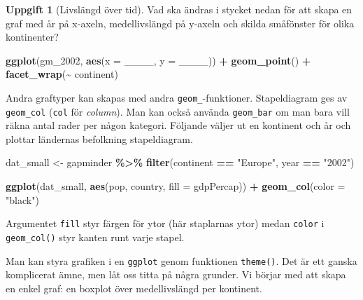 \documentclass[
]{book}
\newenvironment{Shaded}{\begin{snugshade}}{\end{snugshade}}
\newcommand{\AttributeTok}[1]{\textcolor[rgb]{0.13,0.29,0.53}{#1}}
\newcommand{\FunctionTok}[1]{\textcolor[rgb]{0.13,0.29,0.53}{\textbf{#1}}}
\newcommand{\NormalTok}[1]{#1}
\newcommand{\OtherTok}[1]{\textcolor[rgb]{0.56,0.35,0.01}{#1}}
\newcommand{\SpecialCharTok}[1]{\textcolor[rgb]{0.81,0.36,0.00}{\textbf{#1}}}
\newcommand{\StringTok}[1]{\textcolor[rgb]{0.31,0.60,0.02}{#1}}
\theoremstyle{definition}
\theoremstyle{definition}
\theoremstyle{definition}
\newtheorem{exercise}{Uppgift}[chapter]
\theoremstyle{definition}
\theoremstyle{remark}
\begin{document}
\begin{exercise}[Livslängd över tid]

Vad ska ändras i stycket nedan för att skapa en graf med år på x-axeln, medellivslängd på y-axeln och skilda småfönster för olika kontinenter?

\begin{Shaded}
\begin{Highlighting}[]
\FunctionTok{ggplot}\NormalTok{(gm\_2002, }\FunctionTok{aes}\NormalTok{(}\AttributeTok{x =}\NormalTok{ \_\_\_\_, }\AttributeTok{y =}\NormalTok{ \_\_\_\_)) }\SpecialCharTok{+} 
  \FunctionTok{geom\_point}\NormalTok{() }\SpecialCharTok{+}
  \FunctionTok{facet\_wrap}\NormalTok{(}\SpecialCharTok{\textasciitilde{}}\NormalTok{ continent)}
\end{Highlighting}
\end{Shaded}

\end{exercise}

Andra graftyper kan skapas med andra \texttt{geom\_}-funktioner. Stapeldiagram ges av \texttt{geom\_col} (\texttt{col} för \emph{column}). Man kan också använda \texttt{geom\_bar} om man bara vill räkna antal rader per någon kategori.
Följande väljer ut en kontinent och år och plottar ländernas befolkning stapeldiagram.

\begin{Shaded}
\begin{Highlighting}[]
\NormalTok{dat\_small }\OtherTok{\textless{}{-}}\NormalTok{ gapminder }\SpecialCharTok{\%\textgreater{}\%} 
  \FunctionTok{filter}\NormalTok{(continent }\SpecialCharTok{==} \StringTok{"Europe"}\NormalTok{, year }\SpecialCharTok{==} \StringTok{"2002"}\NormalTok{)}

\FunctionTok{ggplot}\NormalTok{(dat\_small, }\FunctionTok{aes}\NormalTok{(pop, country, }\AttributeTok{fill =}\NormalTok{ gdpPercap)) }\SpecialCharTok{+}
  \FunctionTok{geom\_col}\NormalTok{(}\AttributeTok{color =} \StringTok{"black"}\NormalTok{)}
\end{Highlighting}
\end{Shaded}

Argumentet \texttt{fill} styr färgen för ytor (här staplarnas ytor) medan \texttt{color} i \texttt{geom\_col()} styr kanten runt varje stapel.

Man kan styra grafiken i en \texttt{ggplot} genom funktionen \texttt{theme()}. Det är ett ganska komplicerat ämne, men låt oss titta på några grunder. Vi börjar med att skapa en enkel graf: en boxplot över medellivslängd per kontinent.
\end{document}
